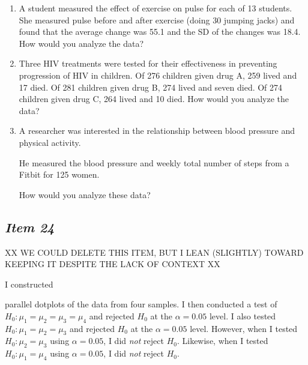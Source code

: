 \begin{enumerate}[leftmargin=1cm, itemsep=.2em]


\item A student measured the effect of exercise on pulse for each of 13 students. She measured pulse before and after exercise (doing 30 jumping jacks) and found that the average change was 55.1 and the SD of the changes was 18.4. How would you analyze the data?


\item Three HIV treatments were tested for their effectiveness in preventing progression of HIV in children. Of 276 children given drug A, 259 lived and 17 died. Of 281 children given drug B, 274 lived and seven died. Of 274 children given drug C, 264 lived and 10 died. How would you analyze the data?


\item A researcher was interested in the relationship between blood pressure and physical activity.


He measured the blood pressure and weekly total number of steps from a Fitbit for 125 women.


How would you analyze these data?


\end{enumerate}





\subsection{\textbf{\textit{Item 24}}} XX WE COULD DELETE THIS ITEM, BUT I LEAN (SLIGHTLY) TOWARD KEEPING IT DESPITE THE LACK OF CONTEXT XX


I constructed


parallel dotplots of the data from four samples. I then conducted a test of $H_0: \mu_1=\mu_2=\mu_3=\mu_4$ and rejected $H_0$ at the $\alpha = 0.05$ level. I also tested $H_0: \mu_1=\mu_2=\mu_3$ and rejected $H_0$ at the $\alpha = 0.05$ level. However, when I tested $H_0: \mu_2=\mu_3$ using $\alpha = 0.05$, I did \textit{not} reject $H_0$. Likewise, when I tested $H_0: \mu_1=\mu_4$ using $\alpha = 0.05$, I did \textit{not} reject $H_0$.


